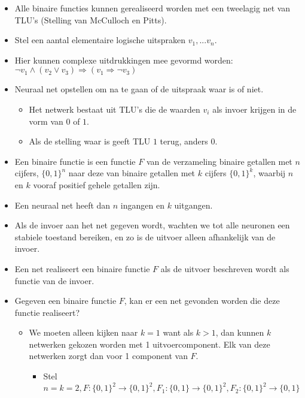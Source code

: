 \begin{itemize}
    \item Alle binaire functies kunnen gerealiseerd worden met een tweelagig net van TLU's (Stelling van McCulloch en Pitts).
    \item Stel een aantal elementaire logische uitspraken $v_1, ... v_n$.
    \item Hier kunnen complexe uitdrukkingen mee gevormd worden: $\neg v_1 \wedge (v_2 \vee v_3) \Rightarrow (v_1 \Rightarrow \neg v_3)$
    \item Neuraal net opstellen om na te gaan of de uitspraak waar is of niet.
    \begin{itemize}
        \item Het netwerk bestaat uit TLU's die de waarden $v_i$ als invoer krijgen in de vorm van $0$ of $1$.
        \item Als de stelling waar is geeft TLU $1$ terug, anders $0$.
    \end{itemize}
    \item Een binaire functie is een functie $F$ van de verzameling binaire getallen met $n$ cijfers, $\{0, 1\}^n$ naar deze van binaire getallen met $k$ cijfers $\{0, 1\}^k$, waarbij $n$ en $k$ vooraf positief gehele getallen zijn. 
    \item Een neuraal net heeft dan $n$ ingangen en $k$ uitgangen.
    \item Als de invoer aan het net gegeven wordt, wachten we tot alle neuronen een stabiele toestand bereiken, en zo is de uitvoer alleen afhankelijk van de invoer. 
    \item Een net realiseert een binaire functie $F$ als de uitvoer beschreven wordt als functie van de invoer. 
    \item Gegeven een binaire functie $F$, kan er een net gevonden worden die deze functie realiseert?
    \begin{itemize}
        \item We moeten alleen kijken naar $k = 1$ want als $k > 1$, dan kunnen $k$ netwerken gekozen worden met 1 uitvoercomponent. Elk van deze netwerken zorgt dan voor 1 component van $F$.
        \begin{itemize}
            \item Stel $n = k = 2, F : \{0, 1\}^2 \rightarrow \{0, 1\}^2, F_1 : \{0, 1\} \rightarrow \{0, 1\}^2, F_2 : \{0, 1\}^2 \rightarrow \{0, 1\}$


\end{itemize}
\end{itemize}
\end{itemize}
